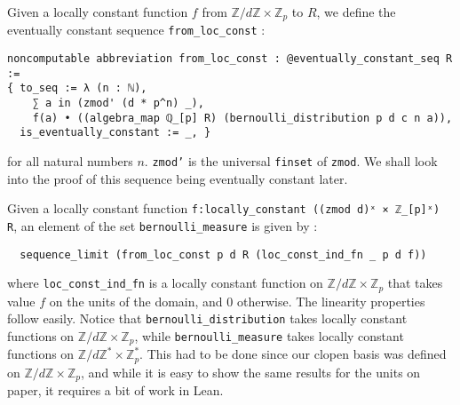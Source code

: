 \documentclass[a4paper,UKenglish,cleveref, autoref, thm-restate,pdfa]{lipics-v2021}
\newcommand{\lean}[1]{\texttt{#1}\xspace} %
\begin{document}
Given a locally constant function $f$ from $\mathbb{Z}/d \mathbb{Z} \times \mathbb{Z}_p$ to $R$, 
we define the eventually constant sequence \lean{from\_loc\_const} : 
\begin{lstlisting}
noncomputable abbreviation from_loc_const : @eventually_constant_seq R :=
{ to_seq := λ (n : ℕ), 
    ∑ a in (zmod' (d * p^n) _), 
    f(a) • ((algebra_map ℚ_[p] R) (bernoulli_distribution p d c n a)),
  is_eventually_constant := _, }
\end{lstlisting} 
for all natural numbers $n$. \lean{zmod'} is the universal \lean{finset} of \lean{zmod}. 
We shall look into the proof of this sequence being eventually constant later. 

Given a locally constant function \lean{f:locally\_constant ((zmod d)ˣ × ℤ\_[p]ˣ) R}, 
an element of the set \lean{bernoulli\_measure} is given by : 
\begin{lstlisting}
  sequence_limit (from_loc_const p d R (loc_const_ind_fn _ p d f))
\end{lstlisting}
where \lean{loc\_const\_ind\_fn} is a locally constant function on $\mathbb{Z}/d \mathbb{Z} \times \mathbb{Z}_p$ 
that takes value $f$ on the units of the domain, and 0 otherwise. The linearity properties follow easily. Notice that \lean{bernoulli\_distribution} takes locally constant functions on $\mathbb{Z}/d \mathbb{Z} \times \mathbb{Z}_p$, 
while \lean{bernoulli\_measure} takes locally constant functions on $\mathbb{Z}/d \mathbb{Z}^* \times \mathbb{Z}_p^*$. This had to be done since our clopen basis was defined on 
$\mathbb{Z}/d \mathbb{Z} \times \mathbb{Z}_p$, and while it is easy to show the same results for the units on paper, it requires a bit of work in Lean.
\end{document}
